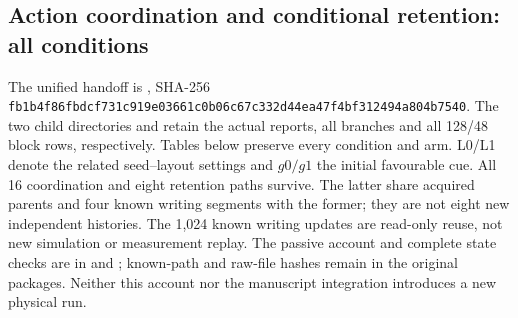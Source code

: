 \subsection*{Action coordination and conditional retention: all conditions}
The unified handoff is , SHA-256 \texttt{fb1b4f86\allowbreak{}fbdcf731\allowbreak{}c919e036\allowbreak{}61c0b06c\allowbreak{}67c332d4\allowbreak{}4ea47f4b\allowbreak{}f312494a\allowbreak{}804b7540}. The two child directories  and  retain the actual reports, all branches and all 128/48 block rows, respectively. Tables below preserve every condition and arm. L0/L1 denote the related seed--layout settings and $g0/g1$ the initial favourable cue. All 16 coordination and eight retention paths survive. The latter share acquired parents and four known writing segments with the former; they are not eight new independent histories. The 1,024 known writing updates are read-only reuse, not new simulation or measurement replay. The passive account and complete state checks are in  and ; known-path and raw-file hashes remain in the original packages. Neither this account nor the manuscript integration introduces a new physical run.

